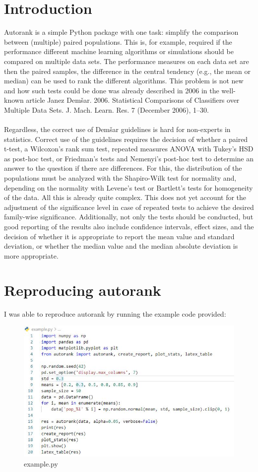 \documentclass[12pt]{article}
\begin{document}
\section{ Introduction}
Autorank is a simple Python package with one task: simplify the comparison between (multiple) paired populations. This is, for example, required if the performance different machine learning algorithms or simulations should be compared on multiple data sets. The performance measures on each data set are then the paired samples, the difference in the central tendency (e.g., the mean or median) can be used to rank the different algorithms. This problem is not new and how such tests could be done was already described in 2006 in the well-known article Janez Demšar. 2006. Statistical Comparisons of Classifiers over Multiple Data Sets. J. Mach. Learn. Res. 7 (December 2006), 1–30.\\\\
Regardless, the correct use of Demšar guidelines is hard for non-experts in statistics. Correct use of the guidelines requires the decision of whether a paired t-test, a Wilcoxon's rank sum test, repeated measures ANOVA with Tukey's HSD as post-hoc test, or Friedman's tests and Nemenyi's post-hoc test to determine an answer to the question if there are differences. For this, the distribution of the populations must be analyzed with the Shapiro-Wilk test for normality and, depending on the normality with Levene's test or Bartlett's tests for homogeneity of the data. All this is already quite complex. This does not yet account for the adjustment of the significance level in case of repeated tests to achieve the desired family-wise significance. Additionally, not only the tests should be conducted, but good reporting of the results also include confidence intervals, effect sizes, and the decision of whether it is appropriate to report the mean value and standard deviation, or whether the median value and the median absolute deviation is more appropriate.


\newpage
\section{Reproducing autorank}
I was able to reproduce autorank by running the example code provided:
\begin{figure}[!htbp]
	\centering
	\includegraphics[width=10 cm]{autorank_example_code.png}
	\caption{example.py}
\end{figure}
\newpage
\end{document}
